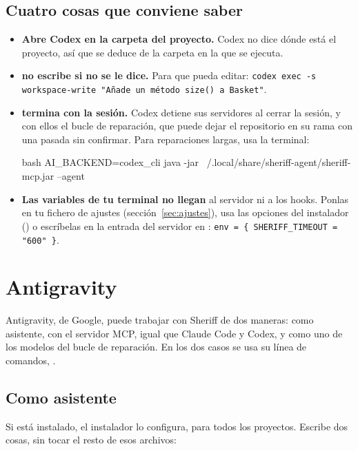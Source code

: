 \documentclass[11pt,a4paper]{article}
\begin{document}
\subsection{Cuatro cosas que conviene saber}

\begin{itemize}
  \item \textbf{Abre Codex en la carpeta del proyecto.} Codex no dice dónde está
        el proyecto, así que se deduce de la carpeta en la que se ejecuta.
  \item \textbf{ no escribe si no se le dice.} Para que pueda
        editar: \texttt{codex exec -s workspace-write "Añade un método size() a Basket"}.
  \item \textbf{ termina con la sesión.} Codex detiene sus
        servidores al cerrar la sesión, y con ellos el bucle de reparación, que
        puede dejar el repositorio en su rama con una pasada sin confirmar. Para
        reparaciones largas, usa la terminal:
\begin{command}[basicstyle=\ttfamily\footnotesize]{bash}
AI_BACKEND=codex_cli java -jar ~/.local/share/sheriff-agent/sheriff-mcp.jar --agent
\end{command}
  \item \textbf{Las variables de tu terminal no llegan} al servidor ni a los
        hooks. Ponlas en tu fichero de ajustes (sección~\ref{sec:ajustes}), usa las
        opciones del instalador () o escríbelas en la entrada del servidor en
        : \texttt{env = \{ SHERIFF\_TIMEOUT = "600" \}}.
\end{itemize}

\section{Antigravity}
\label{sec:antigravity}

Antigravity, de Google, puede trabajar con Sheriff de dos maneras: como
asistente, con el servidor MCP, igual que Claude Code y Codex, y como uno de
los modelos del bucle de reparación. En los dos casos se usa su línea de
comandos, .

\subsection{Como asistente}

Si  está instalado, el instalador lo configura, para todos los
proyectos. Escribe dos cosas, sin tocar el resto de esos archivos:
\end{document}
